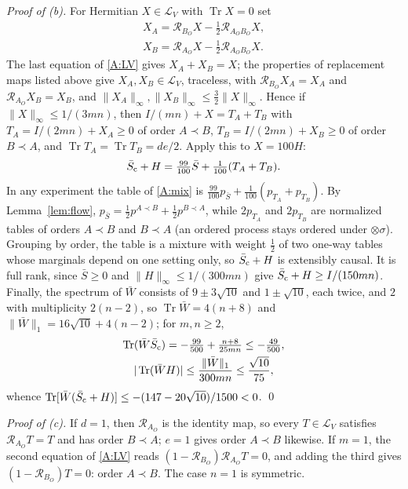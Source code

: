 \documentclass[aps,prl,reprint,superscriptaddress,nofootinbib,longbibliography,raggedbottom]{revtex4-2}
\DeclareMathOperator{\Tr}{Tr}
\newcommand{\R}{\mathcal R}
\begin{document}
\emph{Proof of (b).} For Hermitian $X\in\mathcal L_V$ with $\Tr X=0$ set
\begin{equation}\label{A:split}
\begin{gathered}
X_A=\R_{B_O}X-\tfrac12\R_{A_OB_O}X,\\
X_B=\R_{A_O}X-\tfrac12\R_{A_OB_O}X .
\end{gathered}
\end{equation}
The last equation of \eqref{A:LV} gives $X_A+X_B=X$; the properties of
replacement maps listed above give $X_A,X_B\in\mathcal L_V$, traceless,
with $\R_{B_O}X_A=X_A$ and $\R_{A_O}X_B=X_B$, and
$\|X_A\|_\infty,\|X_B\|_\infty\leq\tfrac32\|X\|_\infty$. Hence if
$\|X\|_\infty\leq1/(3mn)$, then $I/(mn)+X=T_A+T_B$ with
$T_A=I/(2mn)+X_A\geq0$ of order $A\prec B$, $T_B=I/(2mn)+X_B\geq0$ of
order $B\prec A$, and $\Tr T_A=\Tr T_B=de/2$. Apply this to $X=100H$:
\begin{equation}\label{A:mix}
\bar S_{\rm c}+H=\tfrac{99}{100}\bar S+\tfrac1{100}(T_A+T_B).
\end{equation}
In any experiment the table of \eqref{A:mix} is
$\tfrac{99}{100}p_{\bar S}+\tfrac1{100}(p_{T_A}+p_{T_B})$. By
Lemma~\ref{lem:flow}, $p_{\bar S}=\tfrac12p^{A\prec B}+\tfrac12p^{B\prec A}$,
while $2p_{T_A}$ and $2p_{T_B}$ are normalized tables of orders
$A\prec B$ and $B\prec A$ (an ordered process stays ordered under
$\otimes\sigma$). Grouping by order, the table is a mixture with weight
$\tfrac12$ of two one-way tables whose marginals depend on one setting
only, so $\bar S_{\rm c}+H$ is extensibly causal. It is full rank, since
$\bar S\geq0$ and $\|H\|_\infty\leq1/(300mn)$ give
$\bar S_{\rm c}+H\geq I/(150mn)$. Finally, the spectrum of $\bar W$
consists of $9\pm3\sqrt{10}$ and $1\pm\sqrt{10}$, each twice, and $2$ with
multiplicity $2(n-2)$, so $\Tr\bar W=4(n+8)$ and
$\|\bar W\|_1=16\sqrt{10}+4(n-2)$; for $m,n\geq2$,
\begin{equation}\label{A:margin}
\begin{gathered}
\Tr(\bar W\bar S_{\rm c})=-\tfrac{99}{500}+\tfrac{n+8}{25mn}\leq-\tfrac{49}{500},\\
|\Tr(\bar WH)|\leq\frac{\|\bar W\|_1}{300mn}\leq\frac{\sqrt{10}}{75},
\end{gathered}
\end{equation}
whence $\Tr[\bar W(\bar S_{\rm c}+H)]\leq-(147-20\sqrt{10})/1500<0$.
\qed

\emph{Proof of (c).} If $d=1$, then $\R_{A_O}$ is the identity map, so
every $T\in\mathcal L_V$ satisfies $\R_{A_O}T=T$ and has order $B\prec A$;
$e=1$ gives order $A\prec B$ likewise. If $m=1$, the second equation of
\eqref{A:LV} reads $(1-\R_{B_O})\R_{A_O}T=0$, and adding the third gives
$(1-\R_{B_O})T=0$: order $A\prec B$. The case $n=1$ is symmetric.
\end{document}
